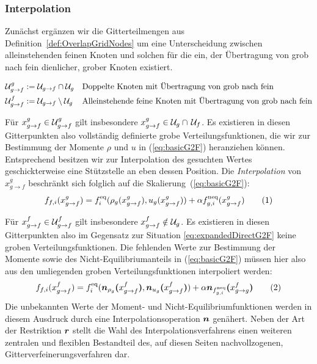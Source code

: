 \newpage
\subsubsection{Interpolation}\label{kap:Interpolation}

Zunächst ergänzen wir die Gitterteilmengen aus Definition~\ref{def:OverlapGridNodes} um eine Unterscheidung zwischen alleinstehenden feinen Knoten und solchen für die ein, der Übertragung von grob nach fein dienlicher, grober Knoten existiert.
\begin{Definition}
\begin{align*}
\mathcal{U}_{g \to f}^g &:= \mathcal{U}_{g \to f} \cap \mathcal{U}_g && \text{Doppelte Knoten mit Übertragung von grob nach fein} \\
\mathcal{U}_{g \to f}^f &:= \mathcal{U}_{g \to f} \setminus \mathcal{U}_g && \text{Alleinstehende feine Knoten mit Übertragung von grob nach fein}
\end{align*}
\end{Definition}

Für \(x_{g \to f}^g \in \mathcal{U}_{g \to f}^g\) gilt insbesondere \(x_{g \to f}^g \in \mathcal{U}_g \cap \, \mathcal{U}_f\). Es existieren in diesen Gitterpunkten also vollständig definierte grobe Verteilungsfunktionen, die wir zur Bestimmung der Momente \(\rho\) und \(u\) in (\ref{eq:basicG2F}) heranziehen können. Entsprechend besitzen wir zur Interpolation des gesuchten Wertes geschickterweise eine Stützstelle an eben dessen Position. Die \emph{Interpolation} von \(x_{g \to f}^g\) beschränkt sich folglich auf die Skalierung~(\ref{eq:basicG2F}):
\[f_{f,i}(x_{g \to f}^g) = f_i^\text{eq}(\rho_g(x_{g \to f}^g), u_g(x_{g \to f}^g)) + \alpha f_{g,i}^\text{neq}(x_{g \to f}^g) \numberthis\label{eq:expandedDirectG2F}\]

Für \(x_{g \to f}^f \in \mathcal{U}_{g \to f}^f\) gilt insbesondere \(x_{g \to f}^f \notin \mathcal{U}_g\). Es existieren in diesen Gitterpunkten also im Gegensatz zur Situation \ref{eq:expandedDirectG2F} keine groben Verteilungsfunktionen. Die fehlenden Werte zur Bestimmung der Momente sowie des Nicht-Equilibriumanteils in (\ref{eq:basicG2F}) müssen hier also aus den umliegenden groben Verteilungsfunktionen interpoliert werden:
\[f_{f,i}(x_{g \to f}^f) = f_i^\text{eq}(\ipolarg{\rho_g}{x_{g \to f}^f}, \ipolarg{u_g}{x_{g \to f}^f}) + \alpha \ipolarg{f_{g,i}^\text{neq}}{x_{g \to g}^f} \numberthis\label{eq:expandedInterpolG2F}\]
Die unbekannten Werte der Moment- und Nicht-Equilibriumfunktionen werden in diesem Ausdruck durch eine Interpolationsoperation \(\operatorname{\boldsymbol{n}}\) genähert. Neben der Art der Restriktion \(\operatorname{\boldsymbol{r}}\) stellt die Wahl des Interpolationsverfahrens einen weiteren zentralen und flexiblen Bestandteil des, auf diesen Seiten nachvollzogenen, Gitterverfeinerungsverfahren dar.

